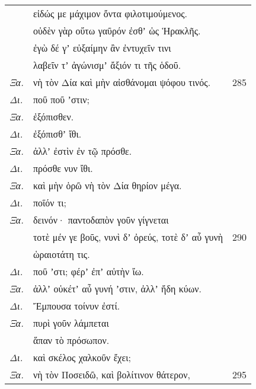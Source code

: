 \documentclass[13pt]{article}
\begin{document}
\begin{greek}
\newpage
\begin{spacing}{1.5}
\begin{tabularx}{\textwidth}{@{}lXr@{}}
& εἰδώς με μάχιμον ὄντα φιλοτιμούμενος. &  \\
& οὐδὲν γὰρ οὕτω γαῦρόν ἐσθʼ ὡς Ἡρακλῆς. &  \\
& ἐγὼ δέ γʼ εὐξαίμην ἂν ἐντυχεῖν τινι &  \\
& λαβεῖν τʼ ἀγώνισμʼ ἄξιόν τι τῆς ὁδοῦ. &  \\
\textit{Ξα.} & νὴ τὸν Δία καὶ μὴν αἰσθάνομαι ψόφου τινός. & 285 \\
\textit{Δι.} & ποῦ ποῦ ʼστιν; &  \\
\textit{Ξα.} & \hspace{6.5em}ἐξόπισθεν. &  \\
\textit{Δι.} & \hspace{11em}ἐξόπισθʼ ἴθι. &  \\
\textit{Ξα.} & ἀλλʼ ἐστὶν ἐν τῷ πρόσθε. &  \\
\textit{Δι.} & \hspace{10.5em}πρόσθε νυν ἴθι. &  \\
\textit{Ξα.} & καὶ μὴν ὁρῶ νὴ τὸν Δία θηρίον μέγα. &  \\
\textit{Δι.} & ποῖόν τι; &  \\
\textit{Ξα.} & \hspace{4em}δεινόν· παντοδαπὸν γοῦν γίγνεται &  \\
& τοτὲ μέν γε βοῦς, νυνὶ δʼ ὀρεύς, τοτὲ δʼ αὖ γυνὴ & 290 \\
& ὡραιοτάτη τις. &  \\
\textit{Δι.} & \hspace{7em}ποῦ ʼστι; φέρʼ ἐπʼ αὐτὴν ἴω. &  \\
\textit{Ξα.} & ἀλλʼ οὐκέτʼ αὖ γυνή ʼστιν, ἀλλʼ ἤδη κύων. &  \\
\textit{Δι.} & Ἔμπουσα τοίνυν ἐστί. &  \\
\textit{Ξα.} & \hspace{9em}πυρὶ γοῦν λάμπεται &  \\
& ἅπαν τὸ πρόσωπον. &  \\
\textit{Δι.} & \hspace{8.5em}καὶ σκέλος χαλκοῦν ἔχει; &  \\
\textit{Ξα.} & νὴ τὸν Ποσειδῶ, καὶ βολίτινον θάτερον, & 295 \\

\end{tabularx}
\end{spacing}


\end{greek}
\end{document}
